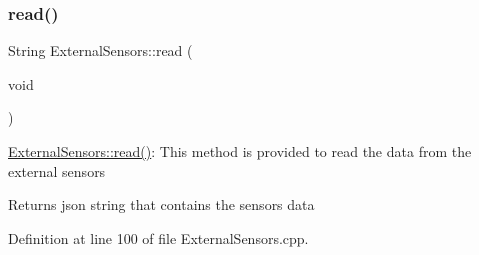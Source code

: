 \subsubsection{\texorpdfstring{read()}{read()}}
{\footnotesize\ttfamily String External\+Sensors\+::read (\begin{DoxyParamCaption}\item[{void}]{ }\end{DoxyParamCaption})}

\hyperlink{class_external_sensors_a53177b81eca3be89508b5511ddcd00fc}{External\+Sensors\+::read()}\+: This method is provided to read the data from the external sensors

\begin{DoxyReturn}{Returns}
json string that contains the sensors data 
\end{DoxyReturn}


Definition at line 100 of file External\+Sensors.\+cpp.


